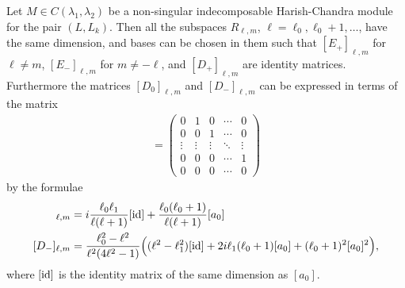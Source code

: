 \begin{theorem}
  Let $M\in C(\lambda_1,\lambda_2)$ be a non-singular indecomposable Harish-Chandra module for the pair $(L,L_k)$. Then all the subspaces $R_{\ell,m}$, $\ell=\ell_0,\ell_0+1,\dotsc$, have the same dimension, and bases can be chosen in them such that $[E_+]_{\ell,m}$ for $\ell\neq m$, $[E_-]_{\ell,m}$ for $m\neq -\ell$, and $[D_+]_{\ell,m}$ are identity matrices. Furthermore the matrices $[D_0]_{\ell,m}$ and $[D_-]_{\ell,m}$ can be expressed in terms of the matrix
  \begin{align*}
    [a_0] =
    \begin{pmatrix}
      0 & 1 & 0 & \cdots & 0 \\
      0 & 0 & 1 & \cdots & 0 \\
      \vdots & \vdots & \vdots & \ddots & \vdots \\
      0 & 0 & 0 & \cdots & 1 \\
      0 & 0 & 0 & \cdots & 0 
    \end{pmatrix}
  \end{align*}
  by the formulae
  \begin{align*}
    [D_0]_{\ell,m} &= i \dfrac{\ell_0\ell_1}{\ell(\ell+1)}[\id] + \dfrac{\ell_0(\ell_0+1)}{\ell(\ell+1)}[a_0] \\
    [D_-]_{\ell,m} &= \dfrac{\ell_0^2-\ell^2}{\ell^2(4\ell^2-1)}\Bigl( (\ell^2-\ell_1^2)[\id] + 2i\ell_1(\ell_0+1)[a_0] + (\ell_0+1)^2[a_0]^2 \Bigr),
  \end{align*}
  where $[\operatorname{id}]$ is the identity matrix of the same dimension as $[a_0]$. 
\end{theorem}

